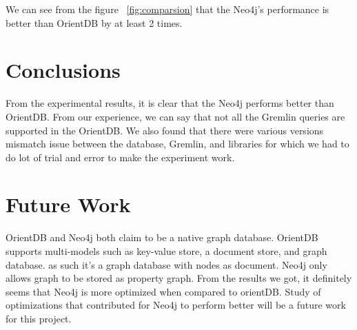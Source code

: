 We can see from the figure ~\ref{fig:comparsion} that the Neo4j's performance is better than OrientDB by at least 2 times.

\section{Conclusions}
From the experimental results, it is clear that the Neo4j performs better than OrientDB. From our experience, we can say that not all the Gremlin queries are supported in the OrientDB. We also found that there were various versions mismatch issue between the database, Gremlin, and libraries for which we had to do lot of trial and error to make the experiment work.

\section{Future Work}
OrientDB and Neo4j both claim to be a native graph database. OrientDB supports multi-models such as key-value store, a document store, and graph database. as such it's a graph database with nodes as document. Neo4j only allows graph to be stored as property graph. From the results we got, it definitely seems that Neo4j is more optimized when compared to orientDB. Study of optimizations that contributed for Neo4j to perform better will be a future work for this project.   

